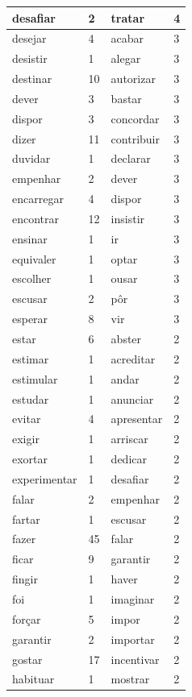 \documentclass[output=paper,colorlinks,citecolor=brown]{langscibook}
\begin{document}
\begin{longtable}{ p{3cm} | p{1cm} | p{3cm} | p{1cm} }
			desafiar & 2 & tratar & 4\\\hline
			desejar & 4 & acabar & 3\\\hline
			desistir & 1 & alegar & 3\\\hline
			destinar & 10 & autorizar & 3\\\hline
			dever & 3 & bastar & 3\\\hline
			dispor & 3 & concordar & 3\\\hline
			dizer & 11 & contribuir & 3\\\hline
			duvidar & 1 & declarar & 3\\\hline
			empenhar & 2 & dever & 3\\\hline
			encarregar & 4 & dispor & 3\\\hline
			encontrar & 12 & insistir & 3\\\hline
			ensinar & 1 & ir & 3\\\hline
			equivaler & 1 & optar & 3\\\hline
			escolher & 1 & ousar & 3\\\hline
			escusar & 2 & pôr & 3\\\hline
			esperar & 8 & vir & 3\\\hline
			estar & 6 & abster & 2\\\hline
			estimar & 1 & acreditar & 2\\\hline
			estimular & 1 & andar & 2\\\hline
			estudar & 1 & anunciar & 2\\\hline
			evitar & 4 & apresentar & 2\\\hline
			exigir & 1 & arriscar & 2\\\hline
			exortar & 1 & dedicar & 2\\\hline
			experimentar & 1 & desafiar & 2\\\hline
			falar & 2 & empenhar & 2\\\hline
			fartar & 1 & escusar & 2\\\hline
			fazer & 45 & falar & 2\\\hline
			ficar & 9 & garantir & 2\\\hline
			fingir & 1 & haver & 2\\\hline
			foi & 1 & imaginar & 2\\\hline
			forçar & 5 & impor & 2\\\hline
			garantir & 2 & importar & 2\\\hline
			gostar & 17 & incentivar & 2\\\hline
			habituar & 1 & mostrar & 2\\\hline

\end{longtable}
\end{document}
